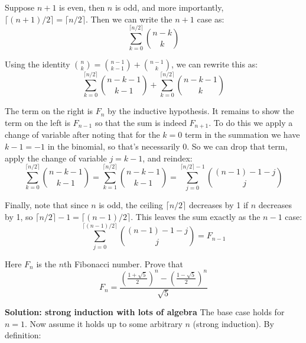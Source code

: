 \documentclass{article}
\begin{document}
Suppose $n + 1$ is even, then $n$ is odd, and more importantly, $\lceil (n+1) / 2 \rceil = \lceil n / 2 \rceil$. Then we can write the $n+1$ case as:
$$\sum_{k=0}^{\lceil n / 2 \rceil} \binom{n - k}{k}$$

Using the identity $\binom{n}{k} = \binom{n-1}{k-1} + \binom{n-1}{k}$, we can rewrite this as:
$$\sum_{k=0}^{\lceil n / 2 \rceil} \binom{n - k - 1}{k - 1} + \sum_{k=0}^{\lceil n / 2 \rceil} \binom{n-k-1}{k}$$

The term on the right is $F_n$ by the inductive hypothesis. It remains to show the term on the left is $F_{n-1}$ so that the sum is indeed $F_{n+1}$. To do this we apply a change of variable after noting that for the $k = 0$ term in the summation we have $k - 1 = -1$ in the binomial, so that's necessarily 0. So we can drop that term, apply the change of variable $j = k-1$, and reindex:
$$\sum_{k=0}^{\lceil n / 2 \rceil} \binom{n - k - 1}{k - 1} = \sum_{k=1}^{\lceil n / 2 \rceil} \binom{n - k - 1}{k - 1} = \sum_{j=0}^{\lceil n / 2 \rceil - 1} \binom{(n - 1) - 1 - j}{j}$$

Finally, note that since $n$ is odd, the ceiling $\lceil n / 2 \rceil$ decreases by 1 if $n$ decreases by 1, so $\lceil n / 2 \rceil - 1 = \lceil (n - 1) / 2\rceil$. This leaves the sum exactly as the $n - 1$ case:
$$\sum_{j=0}^{\lceil (n - 1) / 2\rceil} \binom{(n-1) - 1 - j}{j} = F_{n-1}$$

\begin{problem}
Here $F_n$ is the $n$th Fibonacci number. Prove that
$$F_n = \frac{\left(\frac{1 + \sqrt{5}}{2}\right)^n - \left(\frac{1 - \sqrt{5}}{2}\right)^n}{\sqrt{5}}$$
\end{problem}

\textbf{Solution: strong induction with lots of algebra}
The base case holds for $n = 1$. Now assume it holds up to some arbitrary $n$ (strong induction). By definition:
\end{document}
